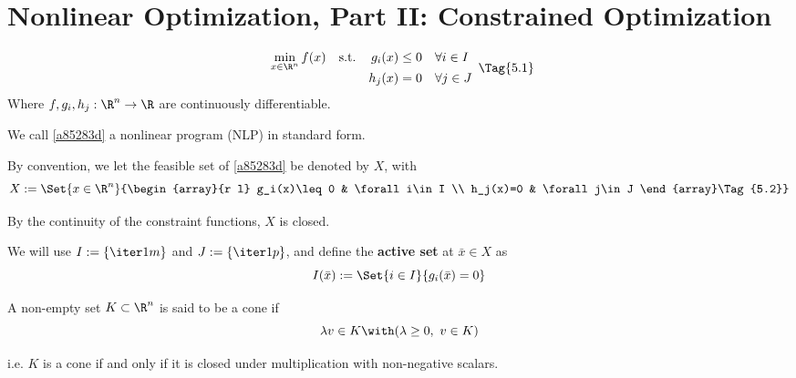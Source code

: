 \section{Nonlinear Optimization, Part II: Constrained Optimization}\label{fc7da02}

\def\pd{\succ} %
\def\psd{\succeq} %
\def\NlpStdForm{\begin{array}{l l r l}
    \displaystyle\min_{x\in\R^n}f(x)
     & \text{s.t.} & g_i(x)\leq0 & \forall i\in I \\
     &             & h_j(x)=0    & \forall j\in J
  \end{array}}
\def\NlpStdCond{\begin{array}{r l}
    g_i(x)\leq0 & \forall i\in I \\
    h_j(x)=0    & \forall j\in J
  \end{array}}

\label{aeac31f}

\begin{equation*}
  \NlpStdForm\Tag{5.1}\label{a85283d}
\end{equation*}
Where $f,g_i,h_j:\R^n\to\R$ are continuously differentiable.

We call \ref{a85283d} a nonlinear program (NLP) in standard form.

By convention, we let the feasible set of \ref{a85283d} be denoted by $X$, with
\begin{equation*}
  X:=\Set{x\in\R^n}{\begin{array}{r l}
      g_i(x)\leq0 & \forall i\in I \\
      h_j(x)=0    & \forall j\in J
    \end{array}\Tag{5.2}}\label{ea8fbff}
\end{equation*}

By the continuity of the constraint functions, $X$ is closed.

We will use $I:=\{\iter1m\}$ and $J:=\{\iter1p\}$, and define the
\textbf{active set} at $\bar x\in X$ as
$$
  I(\bar x):=\Set{i\in I}{g_i(\bar x)=0}
$$

\label{ced12c7}

A non-empty set $K\subset\R^n$ is said to be a cone if
$$
  \lambda v\in K\with(\lambda\geq0,\ v\in K)
$$

i.e. $K$ is a cone if and only if it is closed under multiplication with
non-negative scalars.

\label{c36113c}

